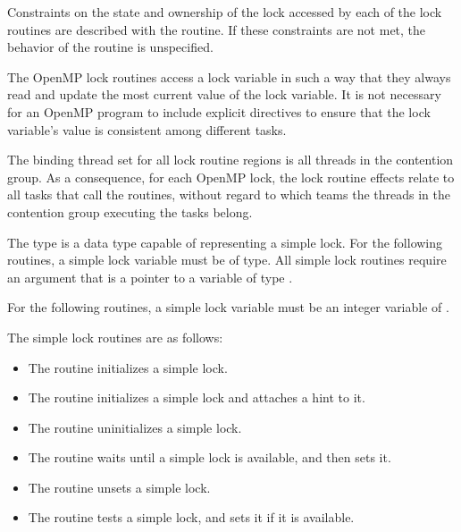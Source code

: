 Constraints on the state and ownership of the lock accessed by each of the lock routines 
are described with the routine. If these constraints are not met, the behavior of the 
routine is unspecified. 

The OpenMP lock routines access a lock variable in such a way that they always read 
and update the most current value of the lock variable. It is not necessary for an 
OpenMP program to include explicit  directives to ensure that the lock variable’s 
value is consistent among different tasks. 

\binding
The binding thread set for all lock routine regions is all threads in the contention group. 
As a consequence, for each OpenMP lock, the lock routine effects relate to all tasks that 
call the routines, without regard to which teams the threads in the contention group 
executing the tasks belong.

\ccppspecificstart
The type  is a data type capable of representing a simple lock. For the 
following routines, a simple lock variable must be of  type. All simple 
lock routines require an argument that is a pointer to a variable of type .
\ccppspecificend

\fortranspecificstart
For the following routines, a simple lock variable must be an integer variable of 
.
\fortranspecificend

The simple lock routines are as follows:

\begin{itemize}
\item The  routine initializes a simple lock.

\item The  routine initializes a simple lock and attaches a hint to it.

\item The  routine uninitializes a simple lock.

\item The  routine waits until a simple lock is available, and then sets it.

\item The  routine unsets a simple lock.

\item The  routine tests a simple lock, and sets it if it is available.
\end{itemize}

